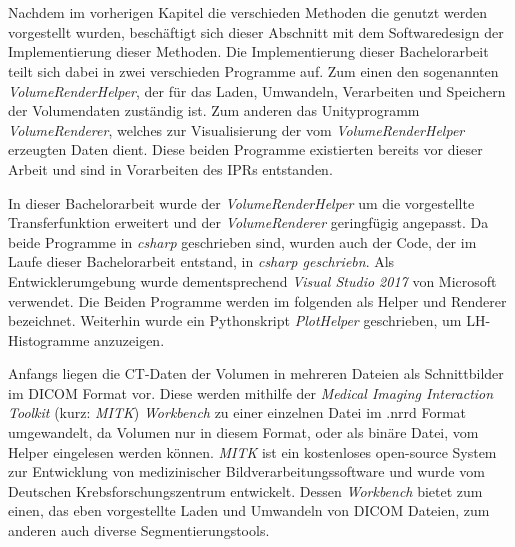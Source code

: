 \chapter{}
\label{sec:concept}


Nachdem im vorherigen Kapitel die verschieden Methoden die genutzt werden vorgestellt wurden, beschäftigt sich dieser Abschnitt mit dem Softwaredesign der Implementierung dieser Methoden.
\newline
Die Implementierung dieser Bachelorarbeit teilt sich dabei in zwei verschieden Programme auf. Zum einen den sogenannten \textit{VolumeRenderHelper}, der für das Laden, Umwandeln, Verarbeiten und Speichern der Volumendaten zuständig ist.
\newline
Zum anderen das Unityprogramm \textit{VolumeRenderer}, welches zur Visualisierung der vom \textit{VolumeRenderHelper} erzeugten Daten dient. Diese beiden Programme existierten bereits vor dieser Arbeit und sind in Vorarbeiten des IPRs entstanden.


In dieser Bachelorarbeit wurde der \textit{VolumeRenderHelper} um die vorgestellte Transferfunktion erweitert und der \textit{VolumeRenderer} geringfügig angepasst. Da beide Programme in \textit{csharp} geschrieben sind, wurden auch der Code, der im Laufe dieser Bachelorarbeit entstand, in \textit{csharp geschriebn}. Als Entwicklerumgebung wurde dementsprechend \textit{Visual Studio 2017} von Microsoft verwendet.
\newline
Die Beiden Programme werden im folgenden als Helper und Renderer bezeichnet.
\newline
Weiterhin wurde ein Pythonskript \textit{PlotHelper} geschrieben, um LH-Histogramme anzuzeigen.


Anfangs liegen die CT-Daten der Volumen in mehreren Dateien als Schnittbilder im DICOM Format vor. Diese werden mithilfe der \textit{Medical Imaging Interaction Toolkit} (kurz: \textit{MITK}) \textit{Workbench} \cite{mitk} zu einer einzelnen Datei im .nrrd Format umgewandelt, da Volumen nur in diesem Format, oder als binäre Datei, vom Helper eingelesen werden können.
\newline
\textit{MITK} ist ein kostenloses open-source System zur Entwicklung von medizinischer Bildverarbeitungssoftware und wurde vom Deutschen Krebsforschungszentrum entwickelt. Dessen \textit{Workbench} bietet zum einen, das eben vorgestellte Laden und Umwandeln von DICOM Dateien, zum anderen auch diverse Segmentierungstools.


